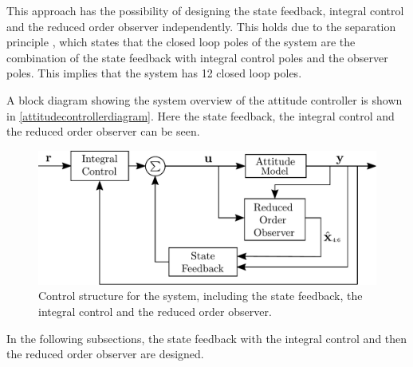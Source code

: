 This approach has the possibility of designing the state feedback, integral control and the reduced order observer independently. This holds due to the separation principle \cite{ObserverChristoffer}, which states that the closed loop poles of the system are the combination of the state feedback with integral control poles and the observer poles. This implies that the system has 12 closed loop poles.%

A block diagram showing the system overview of the attitude controller is shown in \autoref{attitudecontrollerdiagram}. Here the state feedback, the integral control and the reduced order observer can be seen.
\begin{figure}[H]
	\includegraphics[scale=.4]{figures/AttitudeControlDiagram}
	\centering
	\caption{Control structure for the system, including the state feedback, the integral control and the reduced order observer.}
	\label{attitudecontrollerdiagram}
\end{figure}

In the following subsections, the state feedback with the integral control and then the reduced order observer are designed.

%
%
